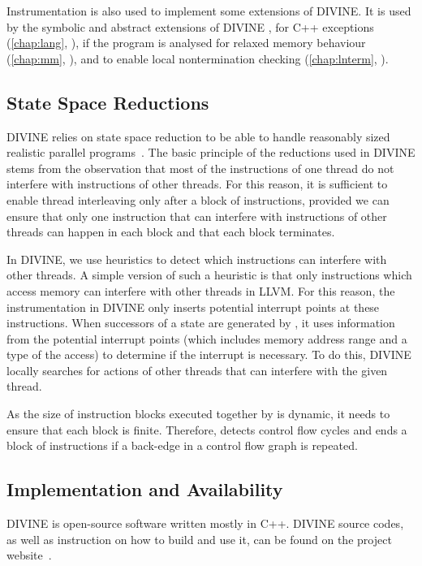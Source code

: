 Instrumentation is also used to implement some extensions of DIVINE.
It is used by the symbolic and abstract extensions of
DIVINE , for C++ exceptions (\autoref{chap:lang},
), if the program is analysed for relaxed memory behaviour
(\autoref{chap:mm}, ), and to enable local nontermination
checking (\autoref{chap:lnterm}, ).

\subsection{State Space Reductions}

DIVINE relies on state space reduction to be able to handle reasonably sized
realistic parallel programs~.
The basic principle of the reductions used in DIVINE stems from the observation
that most of the instructions of one thread do not interfere with instructions
of other threads.
For this reason, it is sufficient to enable thread interleaving only after a
block of instructions, provided we can ensure that only one instruction that
can interfere with instructions of other threads can happen in each block and that each block terminates.

In DIVINE, we use heuristics to detect which instructions can interfere with
other threads.
A simple version of such a heuristic is that only instructions which access
memory can interfere with other threads in LLVM.
For this reason, the instrumentation in DIVINE only inserts potential interrupt
points at these instructions.
When successors of a state are generated by \divm, it uses information from the
potential interrupt points (which includes memory address range and a type of
the access) to determine if the interrupt is necessary.
To do this, DIVINE locally searches for actions of other threads that can
interfere with the given thread.

As the size of instruction blocks executed together by \divm is dynamic, it
needs to ensure that each block is finite.
Therefore, \divm detects control flow cycles and ends a block of instructions
if a back-edge in a control flow graph is repeated.

\subsection{Implementation and Availability}

DIVINE is open-source software written mostly in C++.
DIVINE source codes, as well as instruction on how to build and use it, can be found on the project website~.


